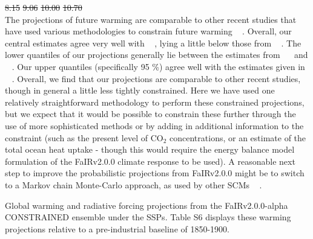 \documentclass[gmd, manuscript]{copernicus}
\providecommand{\DIFadd}[1]{{\protect\color{blue}#1}} %
\providecommand{\DIFdel}[1]{{\protect\color{red}\sout{#1}}}                      %
\providecommand{\DIFaddbegin}{} %
\providecommand{\DIFdelbegin}{} %
\providecommand{\DIFdelend}{} %
\providecommand{\DIFaddFL}[1]{\DIFadd{#1}} %
\begin{document}
\DIFdel{8.15 }%
\DIFdel{9.06 }%
\DIFdel{10.00 }%
\DIFdel{10.70 }\DIFdelend \\
\DIFdelbegin %
\DIFdelend %
\DIFdelbegin %
\DIFdelend \DIFaddbegin \DIFadd{The projections of future warming are comparable to other recent studies that have used various methodologies to constrain future warming \mbox{%
\citep{Brunner2020,Tokarska2020a,Ribes2021}}\hspace{0pt}%
. Overall, our central estimates agree very well with \mbox{%
\citet{Tokarska2020a,Ribes2021}}\hspace{0pt}%
, lying a little below those from \mbox{%
\citet{Ribes2021}}\hspace{0pt}%
. The lower quantiles of our projections generally lie between the estimates from \mbox{%
\citet{Tokarska2020a} }\hspace{0pt}%
and \mbox{%
\citet{Ribes2021}}\hspace{0pt}%
. Our upper quantiles (specifically 95 \%) agree well with the estimates given in \mbox{%
\citet{Ribes2021}}\hspace{0pt}%
. Overall, we find that our projections are comparable to other recent studies, though in general a little less tightly constrained. Here we have used one relatively straightforward methodology to perform these constrained projections, but we expect that it would be possible to constrain these further through the use of more sophisticated methods or by adding in additional information to the constraint (such as the present level of CO$_2$ concentrations, or an estimate of the total ocean heat uptake - though this would require the energy balance model formulation of the FaIRv2.0.0 climate response to be used). A reasonable next step to improve the probabilistic projections from FaIRv2.0.0 might be to switch to a Markov chain Monte-Carlo approach, as used by other SCMs \mbox{%
\citep{Meinshausen2011b,Meinshausen2019}}\hspace{0pt}%
.
}\clearpage
\begin{table}[t]
    \caption{\DIFaddFL{Global warming and radiative forcing projections from the FaIRv2.0.0-alpha CONSTRAINED ensemble under the SSPs. Table S6 displays these warming projections relative to a pre-industrial baseline of 1850-1900.}}
    \label{table:SSP_projections}
    
\end{table}
\end{document}
